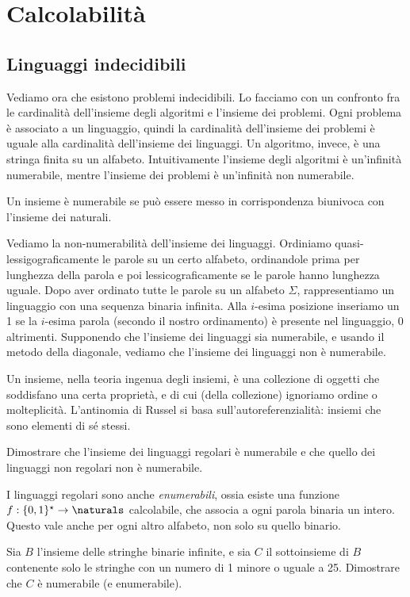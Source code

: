 
\chapter{Calcolabilit\`a}

\section{Linguaggi indecidibili}

Vediamo ora che esistono problemi indecidibili.
Lo facciamo con un confronto fra le cardinalit\`a dell'insieme degli algoritmi e l'insieme dei problemi.
Ogni problema \`e associato a un linguaggio, quindi la cardinalit\`a dell'insieme dei problemi \`e uguale alla cardinalit\`a dell'insieme dei linguaggi. 
Un algoritmo, invece, \`e una stringa finita su un alfabeto.
Intuitivamente l'insieme degli algoritmi \`e un'infinit\`a numerabile, mentre l'insieme dei problemi \`e un'infinit\`a non numerabile.

Un insieme \`e numerabile se pu\`o essere messo in corrispondenza biunivoca con l'insieme dei naturali.

Vediamo la non-numerabilit\`a dell'insieme dei linguaggi.
Ordiniamo quasi-lessigograficamente le parole su un certo alfabeto, ordinandole prima per lunghezza della parola e poi lessicograficamente se le parole hanno lunghezza uguale.
Dopo aver ordinato tutte le parole su un alfabeto $\Sigma$, rappresentiamo un linguaggio con una sequenza binaria infinita.
Alla $i$-esima posizione inseriamo un 1 se la $i$-esima parola (secondo il nostro ordinamento) \`e presente nel linguaggio, 0 altrimenti.
Supponendo che l'insieme dei linguaggi sia numerabile, e usando il metodo della diagonale, vediamo che l'insieme dei linguaggi non \`e numerabile.

Un insieme, nella teoria ingenua degli insiemi, \`e una collezione di oggetti che soddisfano una certa propriet\`a, e di cui (della collezione) ignoriamo ordine o molteplicit\`a.
L'antinomia di Russel si basa sull'autoreferenzialit\`a: insiemi che sono elementi di s\'e stessi.

\begin{esercizio}
	Dimostrare che l'insieme dei linguaggi regolari \`e numerabile e che quello dei linguaggi non regolari non \`e numerabile.
\end{esercizio}

I linguaggi regolari sono anche \emph{enumerabili}, ossia esiste una funzione $f: \{0,1\}^{\star} \to \naturals$ calcolabile, che associa a ogni parola binaria un intero.
Questo vale anche per ogni altro alfabeto, non solo su quello binario.

\begin{esercizio}
	Sia $B$ l'insieme delle stringhe binarie infinite, e sia $C$ il sottoinsieme di $B$ contenente solo le stringhe con un numero di 1 minore o uguale a 25.
	Dimostrare che $C$ \`e numerabile (e enumerabile).
\end{esercizio}

